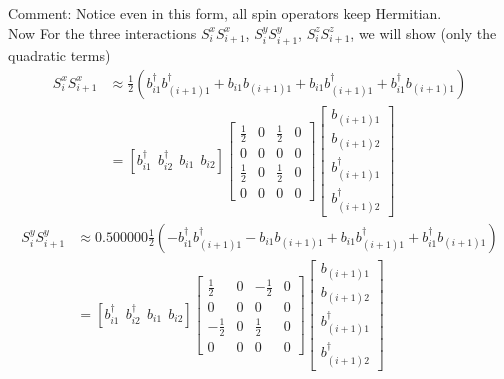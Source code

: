 \documentclass[letter]{article}
\begin{document}
\indent Comment: Notice even in this form, all spin operators keep Hermitian.\\
\indent Now For the three interactions $S_{i}^x S_{i+1}^x$, $S_{i}^y S_{i+1}^y$, $S_{i}^z S_{i+1}^z$, we will show (only the quadratic terms)
$$
\begin{aligned}
    S_{i}^x S_{i+1}^x &\approx\frac{1}{2}\left(b_{i1}^{\dagger}b_{(i+1)1}^{\dagger}+b_{i1}b_{(i+1)1}+b_{i1}b_{(i+1)1}^{\dagger}+b_{i1}^{\dagger}b_{(i+1)1}\right)\\ &=\left[
        b_{i1}^{\dagger} \ \ 
        b_{i2}^{\dagger}\  \ 
        b_{i1}\ \ 
        b_{i2}\right]
       \begin{bmatrix}
            \frac{1}{2} & 0 & \frac{1}{2} & 0 \\
           0 &  0 & 0 &0 \\
           \frac{1}{2} &  0 & \frac{1}{2} &0\\
            0 & 0 & 0& 0
            \end{bmatrix}\begin{bmatrix}
                b_{(i+1)1}  \\
                b_{(i+1)2}  \\
                b_{(i+1)1}^{\dagger}\\
                b_{(i+1)2}^{\dagger}
                \end{bmatrix}
\end{aligned}
$$
$$
\begin{aligned}
    S_{i}^y S_{i+1}^y &\approx0.500000\frac{1}{2}\left(-b_{i1}^{\dagger}b_{(i+1)1}^{\dagger}-b_{i1}b_{(i+1)1}+b_{i1}b_{(i+1)1}^{\dagger}+b_{i1}^{\dagger}b_{(i+1)1}\right)\\ &=\left[
        b_{i1}^{\dagger} \ \ 
        b_{i2}^{\dagger}\  \ 
        b_{i1}\ \ 
        b_{i2}\right]
        \begin{bmatrix}
            \frac{1}{2} & 0 & -\frac{1}{2} & 0 \\
           0 &  0 & 0 &0 \\
           -\frac{1}{2} &  0 & \frac{1}{2} &0\\
            0 & 0 & 0& 0
            \end{bmatrix}\begin{bmatrix}
                b_{(i+1)1}  \\
                b_{(i+1)2}  \\
                b_{(i+1)1}^{\dagger}\\
                b_{(i+1)2}^{\dagger}
                \end{bmatrix}
\end{aligned}
$$
\end{document}
